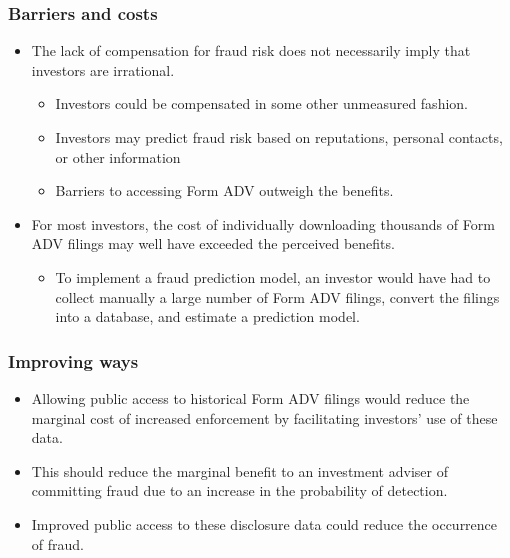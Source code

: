 \subsubsection{Barriers and costs}
\begin{itemize}
\item The lack of compensation for fraud risk does not necessarily imply that investors are irrational.
    \begin{itemize}
    \item Investors could be compensated in some other unmeasured fashion.
    \item Investors may predict fraud risk based on reputations, personal contacts, or other information
    \item Barriers to accessing Form ADV outweigh the benefits.
    \end{itemize}
\item For most investors, the cost of individually downloading thousands of Form ADV filings may well have exceeded the perceived benefits.
    \begin{itemize}
    \item To implement a fraud prediction model, an investor would have had to collect manually a large number of Form ADV filings, convert the filings into a database, and estimate a prediction model.
    \end{itemize}
\end{itemize}



\subsubsection{Improving ways}
\begin{itemize}
\item Allowing public access to historical Form ADV filings would reduce the marginal cost of increased enforcement by facilitating investors' use of these data.
\item This should reduce the marginal benefit to an investment adviser of committing fraud due to an increase in the probability of detection.
\item Improved public access to these disclosure data could reduce the occurrence of fraud.
\end{itemize}

